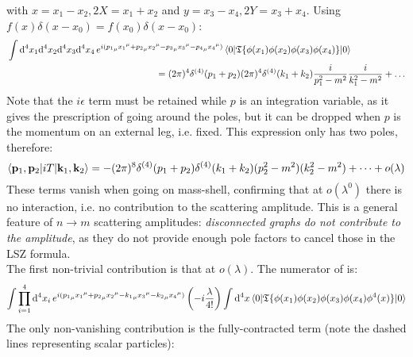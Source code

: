 with $ x = x_1 - x_2 , 2X = x_1 + x_2 $ and $ y = x_3 - x_4 , 2Y = x_3 + x_4 $. Using $ f(x) \delta(x - x_0) = f(x_0) \delta(x - x_0) $:
\begin{equation*}
  \begin{split}
    & \int \mathrm{d}^4x_1 \mathrm{d}^4x_2 \mathrm{d}^4x_3 \mathrm{d}^4x_4\, e^{i ({p_1}_\mu {x_1}^\mu + {p_2}_\mu {x_2}^\mu - {p_3}_\mu {x_3}^\mu - {p_4}_\mu {x_4}^\mu)} \braket{0 | \mathfrak{T}\{\phi(x_1) \phi(x_2) \phi(x_3) \phi(x_4)\} | 0} \\
    & \qquad \qquad \qquad \qquad \qquad \qquad \qquad \qquad = (2\pi)^4 \delta^{(4)}(p_1 + p_2) (2\pi)^4 \delta^{(4)}(k_1 + k_2) \frac{i}{p_1^2 - m^2} \frac{i}{k_1^2 - m^2} + \dots
  \end{split}
\end{equation*}
Note that the $ i\epsilon $ term must be retained while $ p $ is an integration variable, as it gives the prescription of going around the poles, but it can be dropped when $ p $ is the momentum on an external leg, i.e. fixed. This expression only has two poles, therefore:
\begin{equation*}
  \braket{\mathbf{p}_1 , \mathbf{p}_2 | i T | \mathbf{k}_1 , \mathbf{k}_2} = - (2\pi)^8 \delta^{(4)}(p_1 + p_2) \delta^{(4)}(k_1 + k_2) (p_2^2 - m^2) (k_2^2 - m^2) + \dots + o(\lambda)
\end{equation*}
These terms vanish when going on mass-shell, confirming that at $ o(\lambda^0) $ there is no interaction, i.e. no contribution to the scattering amplitude. This is a general feature of $ n \rightarrow m $ scattering amplitudes: \textit{disconnected graphs do not contribute to the amplitude}, as they do not provide enough pole factors to cancel those in the LSZ formula. \\
The first non-trivial contribution is that at $ o(\lambda) $. The numerator of  is:
\begin{equation*}
  \int \prod_{i = 1}^4 \mathrm{d}^4x_i\, e^{i ({p_1}_\mu {x_1}^\mu + {p_2}_\mu {x_2}^\mu - {k_1}_\mu {x_3}^\mu - {k_2}_\mu {x_4}^\mu)} \left( - i \frac{\lambda}{4!} \right) \int \mathrm{d}^4x \braket{0 | \mathfrak{T}\{\phi(x_1) \phi(x_2) \phi(x_3) \phi(x_4) \phi^4(x)\} | 0}
\end{equation*}
The only non-vanishing contribution is the fully-contracted term (note the dashed lines representing scalar particles):
